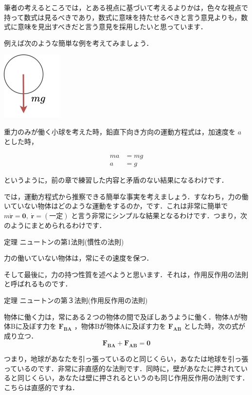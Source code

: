 \documentclass[
  b4paperpaper,
  xelatex,ja=standard]{bxjsbook}
\begin{document}
筆者の考えるところでは，とある視点に基づいて考えるよりかは，色々な視点で持って数式は見るべきであり，数式に意味を持たせるべきと言う意見よりも，数式に意味を見出すべきだと言う意見を採用したいと思っています．

例えば次のような簡単な例を考えてみましょう．

\includegraphics{source/images/newton/newton2.png}

重力のみが働く小球を考えた時，鉛直下向き方向の運動方程式は，加速度を
\(a\) とした時，

\begin{align*}
ma&=mg\\
a&=g
\end{align*}

というように，前の章で練習した内容と矛盾のない結果になるわけです．

では，運動方程式から推察できる簡単な事実を考えましょう．すなわち，力の働いていない物体はどのような運動をするのか，です．これは非常に簡単で
\(m\ddot{\boldsymbol{r}}=\boldsymbol{0},\;\dot{\boldsymbol{r}}=(\text{一定})\)
と言う非常にシンプルな結果となるわけです．つまり，次のようにまとめられるわけです．

\begin{Tbox}{定理}
ニュートンの第1法則(慣性の法則)

力の働いていない物体は，常にその速度を保つ．

\end{Tbox}

そして最後に，力の持つ性質を述べようと思います．それは，作用反作用の法則と呼ばれるものです．

\begin{Tbox}{定理}
ニュートンの第３法則(作用反作用の法則)

物体に働く力は，常にある２つの物体の間で及ぼしあうように働く．物体Aが物体Bに及ぼす力を
\(\boldsymbol{F_{BA}}\) ，物体Bが物体Aに及ぼす力を
\(\boldsymbol{F_{AB}}\) とした時，次の式が成り立つ．
\[\boldsymbol{F_{BA}}+\boldsymbol{F_{AB}}=\boldsymbol{0}\]

\end{Tbox}

つまり，地球があなたを引っ張っているのと同じくらい，あなたは地球を引っ張っているのです．非常に非直感的な法則です．同時に，壁があなたに押されていると同じくらい，あなたは壁に押されるというのも同じ作用反作用の法則です．こちらは直感的ですね．
\end{document}
